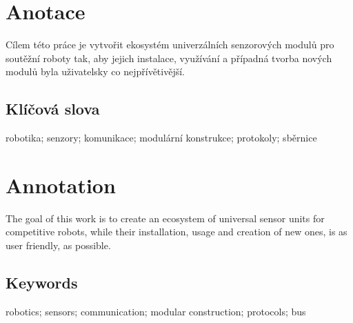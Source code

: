 \documentclass{template/template}
\author{Tomáš Rohlínek}
\begin{document}
\maketitle



\pagestyle{empty}

\section*{Anotace}
Cílem této práce je vytvořit ekosystém univerzálních senzorových modulů pro soutěžní roboty tak, aby jejich instalace, využívání a případná tvorba nových modulů byla uživatelsky co nejpřívětivější.

\subsection*{Klíčová slova}
robotika; senzory; komunikace; modulární konstrukce; protokoly; sběrnice

\vspace{20mm}

\section*{Annotation}
The goal of this work is to create an ecosystem of universal sensor units for competitive robots, while their installation, usage and creation of new ones, is as user friendly, as possible.

\subsection*{Keywords}
robotics; sensors; communication; modular construction; protocols; bus

\newpage
\pagestyle{plain}

\tableofcontents %

\setcounter{figure}{0}
\setcounter{table}{0}
\newpage









\end{document}
